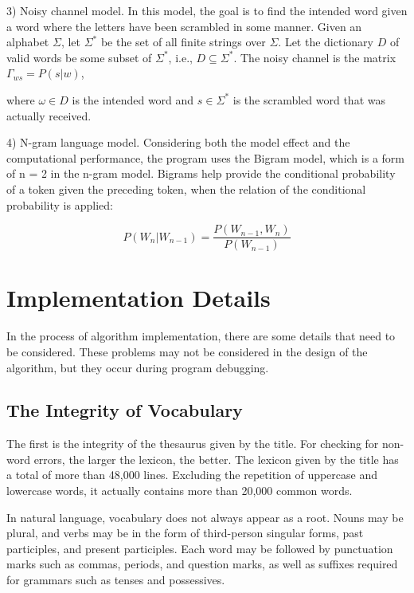 \documentclass{article}
\begin{document}
3) Noisy channel model. In this model, the goal is to find the intended word given a word where the letters have been scrambled in some manner.
Given an alphabet $\Sigma$, let $\Sigma^{*}$ be the set of all finite strings over $\Sigma$. Let the dictionary $D$ of valid words be some subset of $\Sigma^{*}$, i.e., $D\subseteq\Sigma^{*}$. The noisy channel is the matrix $\varGamma_{ws}=P(s|w)$,

where $\omega\in D$ is the intended word and $s\in\Sigma^{*}$ is the scrambled word that was actually received.

4) N-gram language model. Considering both the model effect and the
computational performance, the program uses the Bigram model, which
is a form of n = 2 in the n-gram model. Bigrams help provide the conditional
probability of a token given the preceding token, when the relation
of the conditional probability is applied:

$$
P(W_{n}|W_{n-1})=\frac{P(W_{n-1},W_{n})}{P(W_{n-1})}
$$

\section{Implementation Details}

\label{sec:implementation-details}

In the process of algorithm implementation, there are some details
that need to be considered. These problems may not be considered in
the design of the algorithm, but they occur during program debugging.

\subsection{The Integrity of Vocabulary}

The first is the integrity of the thesaurus given by the title. For
checking for non-word errors, the larger the lexicon, the better.
The lexicon given by the title has a total of more than 48,000 lines.
Excluding the repetition of uppercase and lowercase words, it actually
contains more than 20,000 common words.

In natural language, vocabulary does not always appear as a root.
Nouns may be plural, and verbs may be in the form of third-person
singular forms, past participles, and present participles. Each word
may be followed by punctuation marks such as commas, periods, and
question marks, as well as suffixes required for grammars such as
tenses and possessives.
\end{document}
